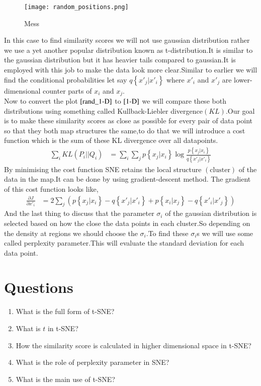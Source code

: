 \documentclass[journal,12pt,onecolumn]{IEEEtran}
\providecommand{\brak}[1]{\ensuremath{\left(#1\right)}}
\providecommand{\cbrak}[1]{\ensuremath{\left\{#1\right\}}}
\theoremstyle{remark}
\numberwithin{equation}{section}
\begin{document}
		   \begin{figure}[ht!]
		     \centering
		     \texttt{[image: random\_positions.png]}
		     \caption{Mess}
		     \label{rand_1-D}
		   \end{figure}
	    In this case to find similarity scores we will not use gaussian distribution rather we use a yet another popular distribution known as t-distribution.It is similar to the gaussian distribution but it has heavier tails compared to gaussian.It is employed with this job to make the data look more clear.Similar to earlier we will find the conditional probabilities let say $q\cbrak{x'_j|x'_i}$ where $x'_i$ and $x'_j$ are lower-dimensional counter parts of $x_i$ and $x_j$.\\
	    Now to convert the plot $\ref{rand_1-D}$ to $\ref{1-D}$ we will compare these both distributions using something called Kullback-Liebler divergence$\brak{KL}$.Our goal is to make these similarity scores as close as possible for every pair of data point so that they both map structures the same,to do that we will introduce a cost function which is the sum of these KL divergence over all datapoints.
	    \begin{align}
		    \sum_iKL\brak{P_i||Q_i} &=\sum_i\sum_jp\cbrak{x_j|x_i}\log\frac{p\cbrak{x_j|x_i}}{q\cbrak{x'_j|x'_i}} 
            \end{align}
	    By minimising the cost function SNE retains the local structure $\brak{\text{cluster}}$ of the data in the map.It can be done by using gradient-descent method. The gradient of this cost function looks like,
	    \begin{align}
		    \frac{\partial J}{\partial x'_i} &= 2\sum_{j}\brak{p\cbrak{x_j|x_i} - q\cbrak{x'_j|x'_i} + p\cbrak{x_i|x_j} - q\cbrak{x'_i|x'_j}}
	    \end{align}
	   And the last thing to discuss that the parameter $\sigma_i$ of the gaussian distribution is selected based on how the close the data points in each cluster.So depending on the density at regions we should choose the $\sigma_i$.To find these $\sigma_i$s we will use some called perplexity parameter.This will evaluate the standard deviation for each data point.
	   \section{Questions}
	    \begin{enumerate}
             \item What is the full form of t-SNE?
             \item What is $t$ in t-SNE?
	     \item How the similarity score is calculated in higher dimensional space in t-SNE?
	     \item What is the role of perplexity parameter in SNE?
	     \item What is the main use of t-SNE?
	    \end{enumerate}
\end{document}
